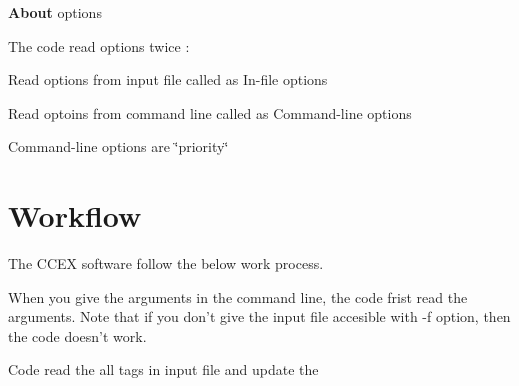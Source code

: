 {\bfseries About} options {\bfseries } 

The code read options twice \-:
\begin{DoxyItemize}
\item Read options from input file called as In-\/file options
\item Read optoins from command line called as Command-\/line options \par

\item Command-\/line options are \char`\"{}priority\char`\"{} \par

\end{DoxyItemize}\hypertarget{GettingStarted_Workflow}{}\section{Workflow}\label{GettingStarted_Workflow}
The C\-C\-E\-X software follow the below work process.

When you give the arguments in the command line, the code frist read the arguments. Note that if you don't give the input file accesible with -\/f option, then the code doesn't work.

Code read the all tags in input file and update the

 